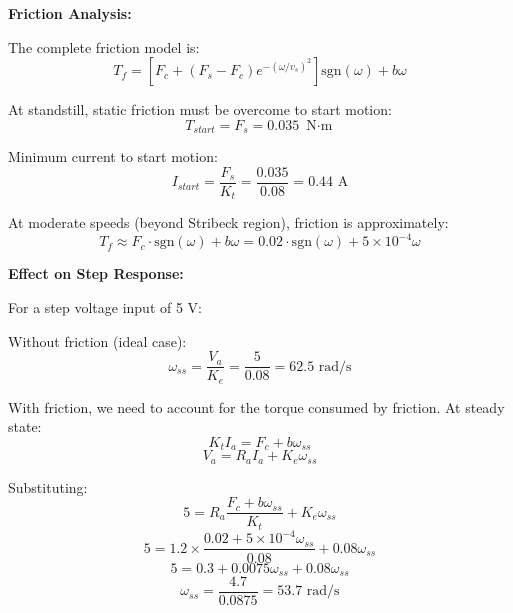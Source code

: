 \textbf{Friction Analysis:}

The complete friction model is:
\begin{equation}
    T_f = \left[F_c + (F_s - F_c)e^{-(\omega/v_s)^2}\right]\text{sgn}(\omega) + b\omega
\end{equation}

At standstill, static friction must be overcome to start motion:
\begin{equation}
    T_{start} = F_s = 0.035 \text{ N$\cdot$m}
\end{equation}

Minimum current to start motion:
\begin{equation}
    I_{start} = \frac{F_s}{K_t} = \frac{0.035}{0.08} = 0.44 \text{ A}
\end{equation}

At moderate speeds (beyond Stribeck region), friction is approximately:
\begin{equation}
    T_f \approx F_c \cdot \text{sgn}(\omega) + b\omega = 0.02 \cdot \text{sgn}(\omega) + 5 \times 10^{-4}\omega
\end{equation}

\textbf{Effect on Step Response:}

For a step voltage input of 5 V:

Without friction (ideal case):
\begin{equation}
    \omega_{ss} = \frac{V_a}{K_e} = \frac{5}{0.08} = 62.5 \text{ rad/s}
\end{equation}

With friction, we need to account for the torque consumed by friction. At steady state:
\begin{equation}
    K_t I_a = F_c + b\omega_{ss}
\end{equation}
\begin{equation}
    V_a = R_a I_a + K_e \omega_{ss}
\end{equation}

Substituting:
\begin{equation}
    5 = R_a \frac{F_c + b\omega_{ss}}{K_t} + K_e \omega_{ss}
\end{equation}
\begin{equation}
    5 = 1.2 \times \frac{0.02 + 5 \times 10^{-4}\omega_{ss}}{0.08} + 0.08\omega_{ss}
\end{equation}
\begin{equation}
    5 = 0.3 + 0.0075\omega_{ss} + 0.08\omega_{ss}
\end{equation}
\begin{equation}
    \omega_{ss} = \frac{4.7}{0.0875} = 53.7 \text{ rad/s}
\end{equation}

